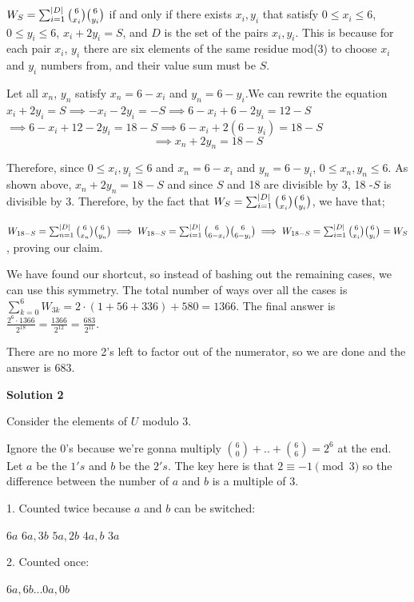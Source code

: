 \begin{enumerate}
 $W_S = \sum_{i=1}^{|D|} \tbinom{6}{x_i}\tbinom{6}{y_i}$ if and only if there exists $x_i, y_i$ that satisfy $0\leq x_i \leq 6$, $0\leq y_i \leq 6$, $x_i + 2y_i = S$, and $D$  is the set of the pairs $x_i, y_i$. This is because for each pair $x_i$, $y_i$ there are six elements of the same residue mod(3) to choose $x_i$ and $y_i$ numbers from, and their value sum must be $S$.

 Let all $x_n$, $y_n$ satisfy $x_n = 6-x_i$ and $y_n = 6-y_i$.We can rewrite the equation $x_i+ 2y_i = S \implies -x_i- 2y_i = -S \implies 6-x_i+ 6-2y_i= 12 - S$$\implies 6-x_i+12-2y_i = 18-S \implies 6-x_i + 2(6-y_i) = 18-S$
 \[\implies x_n + 2y_n = 18 - S\]

 Therefore, since $0\leq x_i, y_i\leq 6$ and $x_n = 6-x_i$ and $y_n = 6-y_i$, $0\leq x_n, y_n\leq 6$. As shown above, $x_n + 2y_n = 18 - S$ and since $S$ and 18 are divisible by 3, 18 -$S$ is divisible by 3. Therefore, by the fact that $W_S = \sum_{i=1}^{|D|} \tbinom{6}{x_i}\tbinom{6}{y_i}$, we have that;

 $W_{18-S} = \sum_{n=1}^{|D|} \tbinom{6}{x_n}\tbinom{6}{y_n} \implies W_{18-S} =  \sum_{i=1}^{|D|} \tbinom{6}{6-x_i}\tbinom{6}{6-y_i} \implies W_{18-S} =  \sum_{i=1}^{|D|} \tbinom{6}{x_i}\tbinom{6}{y_i} = W_S$, proving our claim.

 We have found our shortcut, so instead of bashing out the remaining cases, we can use this symmetry. The total number of ways over all the cases is $\sum_{k=0}^{6} W_{3k} = 2 \cdot (1+56+336)+580 = 1366$. The final answer is $\frac{2^{6}\cdot 1366}{2^{18}} = \frac{1366}{2^{12}} = \frac{683}{2^{11}}.$

 There are no more 2’s left to factor out of the numerator, so we are done and the answer is $\boxed{\boxed{683}}$.

 



\textbf{Solution 2}

Consider the elements of $U$ modulo $3.$

 Ignore the $0$'s because we're gonna multiply $\binom{6}{0}+..+\binom{6}{6}=2^6$ at the end. Let $a$ be the $1's$ and $b$ be the $2's$. The key here is that $2 \equiv -1 \pmod{3}$ so the difference between the number of $a$ and $b$ is a multiple of $3$.

 1. Counted twice because $a$ and $b$ can be switched:

 $6a$
$6a,3b$
$5a,2b$
$4a,b$
$3a$

 2. Counted once:

 $6a,6b$...$0a,0b$


\end{enumerate}
